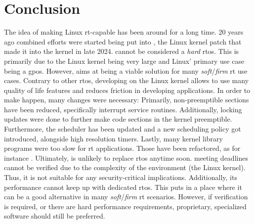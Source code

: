 \documentclass[10pt,twocolumn,a4paper]{article}
\begin{document}
\section{Conclusion}
The idea of making Linux \acrshort{rt}-capable has been around for a long time.
20 years ago combined efforts were started being put into , the Linux kernel patch that made it into the kernel in late 2024.
 cannot be considered a \emph{hard} \acrshort{rtos}.
This is primarily due to the Linux kernel being very large and Linux' primary use case being a \acrshort{gpos}.
However,  aims at being a viable solution for many \emph{soft}/\emph{firm} \acrshort{rt} use cases.
Contrary to other \acrshort{rtos}, developing on the Linux kernel allows to use many quality of life features and reduces friction in developing applications.
In order to make  happen, many changes were necessary:
Primarily, non-preemptible sections have been reduced, specifically interrupt service routines.
Additionally, locking updates were done to further make code sections in the kernel preemptible.
Furthermore, the scheduler has been updated and a new scheduling policy got introduced, alongside high resolution timers.
Lastly, many kernel library programs were too slow for \acrshort{rt} applications.
Those have been refactored, as for instance .
Ultimately,  is unlikely to replace \acrshort{rtos} anytime soon.
 meeting deadlines cannot be verified due to the complexity of the environment (the Linux kernel).
Thus, it is not suitable for any security-critical implications.
Additionally, its performance cannot keep up with dedicated \acrshort{rtos}.
This puts  in a place where it can be a good alternative in many \emph{soft}/\emph{firm} \acrshort{rt} scenarios.
However, if verification is required, or there are hard performance requirements, proprietary, specialized software should still be preferred.


\printglossaries

\printbibliography
\end{document}

